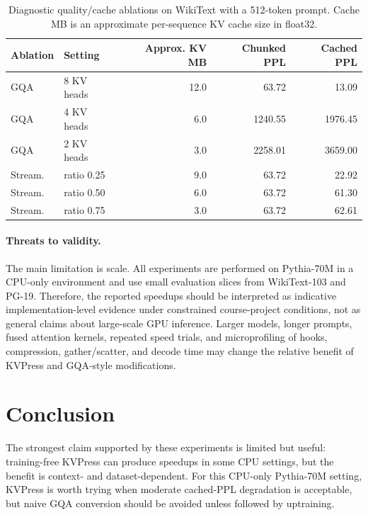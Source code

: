 \documentclass{article}
\begin{document}
\begin{table}[!htbp]
  \caption{Diagnostic quality/cache ablations on WikiText with a 512-token prompt. Cache MB is an approximate per-sequence KV cache size in float32.}
  \label{tab:ablations}
  \centering
  \small
  \setlength{\tabcolsep}{3pt}
  \begin{tabular}{llrrr}
    \toprule
    Ablation & Setting & Approx. KV MB & Chunked PPL & Cached PPL \\
    \midrule
    GQA & 8 KV heads & 12.0 & 63.72 & 13.09 \\
    GQA & 4 KV heads & 6.0 & 1240.55 & 1976.45 \\
    GQA & 2 KV heads & 3.0 & 2258.01 & 3659.00 \\
    Stream. & ratio 0.25 & 9.0 & 63.72 & 22.92 \\
    Stream. & ratio 0.50 & 6.0 & 63.72 & 61.30 \\
    Stream. & ratio 0.75 & 3.0 & 63.72 & 62.61 \\
    \bottomrule
  \end{tabular}
\end{table}

\FloatBarrier

\paragraph{Threats to validity.}
The main limitation is scale. All experiments are performed on Pythia-70M in a CPU-only environment and use small evaluation slices from WikiText-103 and PG-19. Therefore, the reported speedups should be interpreted as indicative implementation-level evidence under constrained course-project conditions, not as general claims about large-scale GPU inference. Larger models, longer prompts, fused attention kernels, repeated speed trials, and microprofiling of hooks, compression, gather/scatter, and decode time may change the relative benefit of KVPress and GQA-style modifications.

\section{Conclusion}

The strongest claim supported by these experiments is limited but useful: training-free KVPress can produce speedups in some CPU settings, but the benefit is context- and dataset-dependent. For this CPU-only Pythia-70M setting, KVPress is worth trying when moderate cached-PPL degradation is acceptable, but naive GQA conversion should be avoided unless followed by uptraining.
\end{document}
